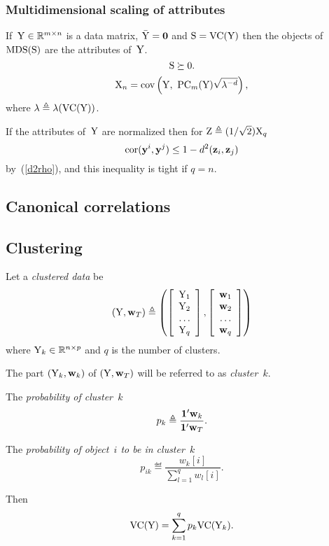 \documentclass[10pt,a4paper]{article}
\theoremstyle{plain} \newtheorem{Lem}{Lemma}
\begin{document}
\subsubsection{Multidimensional scaling of attributes}

If~$\mathrm Y \in \mathbb R^{m \times n}$ is a data matrix, $\bar {\mathrm Y} = \mathbf 0$ and $\mathrm S = \mathrm {VC} (\mathrm Y)$
then the objects of $\mathrm {MDS}(\mathrm S)$ are the attributes of~$\mathrm Y$.
$$ \mathrm S \succeq 0. $$
$$ \mathrm X_n = \mathrm {cov} \left(\mathrm Y, \ \mathrm {PC}_m(\mathrm Y) \sqrt{\mathbf \lambda^{-d}} \right), $$
where $\mathbf \lambda \triangleq \mathbf \lambda(\mathrm {VC}(\mathrm Y))$.

If the attributes of~$\mathrm Y$ are normalized
then for $\mathrm Z \triangleq (1/\sqrt 2) \mathrm X_q$
$$ \mathrm {cor}(\mathbf y^i, \mathbf y^j) \le 1 - d^2(\mathbf z_i, \mathbf z_j) $$
by~(\ref{d2rho}),
and this inequality is tight if $q = n$.


\subsection {Canonical correlations}
\comm{}



\subsection{Clustering}

Let a {\em clustered data} be
$$ (\mathrm Y, \mathbf w_T) \triangleq
\left (
\left[
\begin{array}{c}
\mathrm Y_1 \\
\mathrm Y_2 \\
\dots \\
\mathrm Y_q
\end{array}
\right],
\left[
\begin{array}{c}
\mathbf w_1 \\
\mathbf w_2 \\
\dots \\
\mathbf w_q
\end{array}
\right]
\right)
$$
where $\mathrm Y_k \in \mathbb R^{n \times p}$ and $q$ is the number of clusters.

The part $(\mathrm Y_k,\mathbf w_k)$ of $(\mathrm Y, \mathbf w_T)$ will be referred to as {\em cluster~$k$}.

The {\em probability of cluster~$k$}
$$ p_k \triangleq \frac {\mathbf 1' \mathbf w_k} {\mathbf 1' \mathbf w_T}. $$

The {\em probability of object~$i$ to be in cluster~$k$}
$$ p_{ik} \eqdef \frac {w_k[i]} {\sum_{l=1}^q w_l[i]}. $$

Then
\begin{equation*}
  \mathrm {VC}(\mathrm Y) = \sum_{k=1}^q p_k \mathrm {VC}(\mathrm Y_k).
\end{equation*}
\end{document}
